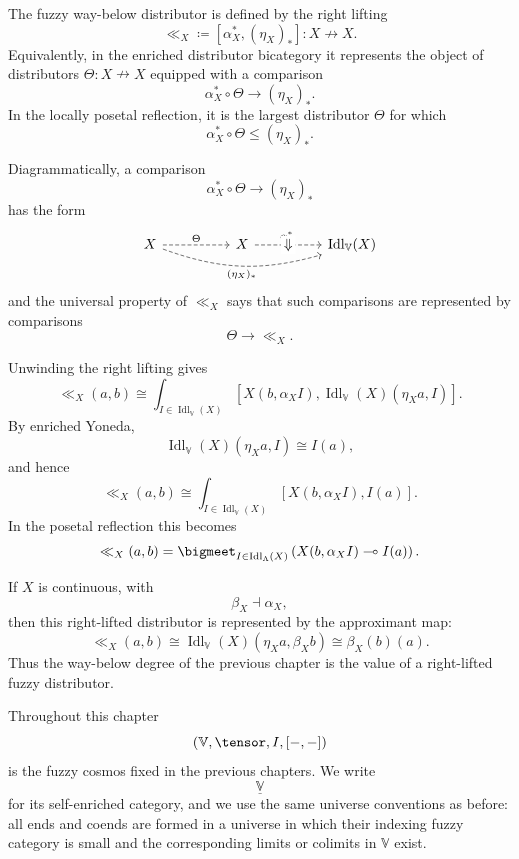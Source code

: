 The fuzzy way-below distributor is defined by the right lifting
\[
    \ll_X
    \coloneqq
    [\alpha_X^\ast,(\eta_X)_\ast]
    :
    X\nrightarrow X.
\]
Equivalently, in the enriched distributor bicategory it represents the object of
distributors \(\Theta:X\nrightarrow X\) equipped with a comparison
\[
    \alpha_X^\ast\circ\Theta\to(\eta_X)_\ast.
\]
In the locally posetal reflection, it is the largest distributor \(\Theta\) for
which
\[
    \alpha_X^\ast\circ\Theta\leq(\eta_X)_\ast.
\]

Diagrammatically, a comparison
\[
    \alpha_X^\ast\circ\Theta\to(\eta_X)_\ast
\]
has the form
\[
\begin{tikzcd}[column sep=huge,row sep=large]
X
    \ar[r,dashed,"\Theta"]
    \ar[rr,bend right=18,dashed,"{(\eta_X)_\ast}"']
&
X
    \ar[r,dashed,"\alpha_X^\ast"]
&
\operatorname{Idl}_{\mathbb V}(X)
    \ar[phantom,from=1-2,to=1-3,"\Downarrow" description]
\end{tikzcd}
\]
and the universal property of \(\ll_X\) says that such comparisons are
represented by comparisons
\[
    \Theta\to \ll_X.
\]

Unwinding the right lifting gives
\[
    \ll_X(a,b)
    \cong
    \int_{I\in \operatorname{Idl}_{\mathbb V}(X)}
    \left[
        X(b,\alpha_X I),
        \operatorname{Idl}_{\mathbb V}(X)(\eta_X a,I)
    \right].
\]
By enriched Yoneda,
\[
    \operatorname{Idl}_{\mathbb V}(X)(\eta_X a,I)
    \cong
    I(a),
\]
and hence
\[
    \ll_X(a,b)
    \cong
    \int_{I\in \operatorname{Idl}_{\mathbb V}(X)}
    \left[
        X(b,\alpha_X I),
        I(a)
    \right].
\]
In the posetal reflection this becomes
\[
    \ll_X(a,b)
    =
    \bigmeet_{I\in\operatorname{Idl}_\Lambda(X)}
    \left(
        X(b,\alpha_X I)\multimap I(a)
    \right).
\]

If \(X\) is continuous, with
\[
    \beta_X\dashv \alpha_X,
\]
then this right-lifted distributor is represented by the approximant map:
\[
    \ll_X(a,b)
    \cong
    \operatorname{Idl}_{\mathbb V}(X)(\eta_X a,\beta_X b)
    \cong
    \beta_X(b)(a).
\]
Thus the way-below degree of the previous chapter is the value of a right-lifted
fuzzy distributor.

Throughout this chapter
\[
    (\mathbb V,\tensor,I,[-,-])
\]
is the fuzzy cosmos fixed in the previous chapters. We write
\[
    \underline{\mathbb V}
\]
for its self-enriched category, and we use the same universe conventions as
before: all ends and coends are formed in a universe in which their indexing
fuzzy category is small and the corresponding limits or colimits in
\(\mathbb V\) exist.


